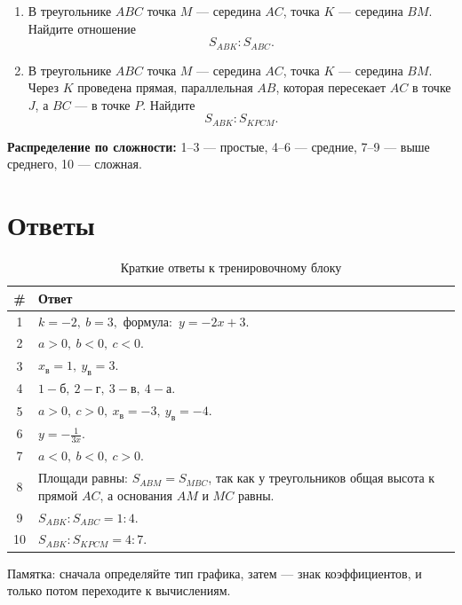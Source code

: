 \documentclass[a4paper,12pt]{article}
\begin{document}
\begin{enumerate}
  \item В треугольнике \(ABC\) точка \(M\) --- середина \(AC\), точка \(K\) --- середина \(BM\). Найдите отношение
  \[
  S_{ABK}:S_{ABC}.
  \]

  \item В треугольнике \(ABC\) точка \(M\) --- середина \(AC\), точка \(K\) --- середина \(BM\). Через \(K\) проведена прямая, параллельная \(AB\), которая пересекает \(AC\) в точке \(J\), а \(BC\) --- в точке \(P\). Найдите
  \[
  S_{ABK}:S_{KPCM}.
  \]
\end{enumerate}

\bigskip
\textbf{Распределение по сложности:}
1--3 --- простые, 4--6 --- средние, 7--9 --- выше среднего, 10 --- сложная.

\newpage

\section*{Ответы}

\begin{table}[h!]
\centering
\caption{Краткие ответы к тренировочному блоку}
\begin{tabularx}{\linewidth}{@{}cX@{}}
\toprule
\textbf{\#} & \textbf{Ответ} \\
\midrule
1 & \(\displaystyle k=-2,\ b=3,\) формула: \(\,y=-2x+3.\) \\
2 & \(\displaystyle a>0,\ b<0,\ c<0.\) \\
3 & \(\displaystyle x_{\text{в}}=1,\ y_{\text{в}}=3.\) \\
4 & \(1\!-\!\text{б},\ 2\!-\!\text{г},\ 3\!-\!\text{в},\ 4\!-\!\text{а}.\) \\
5 & \(\displaystyle a>0,\ c>0,\ x_{\text{в}}=-3,\ y_{\text{в}}=-4.\) \\
6 & \(\displaystyle y=-\frac{1}{3x}.\) \\
7 & \(\displaystyle a<0,\ b<0,\ c>0.\) \\
8 & Площади равны: \(\displaystyle S_{ABM}=S_{MBC}\), так как у треугольников общая высота к прямой \(AC\), а основания \(AM\) и \(MC\) равны. \\
9 & \(\displaystyle S_{ABK}:S_{ABC}=1:4.\) \\
10 & \(\displaystyle S_{ABK}:S_{KPCM}=4:7.\) \\
\bottomrule
\end{tabularx}
\end{table}

\vfill
\begin{center}
{\small\textcolor{darkaccent}{Памятка: сначала определяйте тип графика, затем --- знак коэффициентов, и только потом переходите к вычислениям.}}
\end{center}
\end{document}
